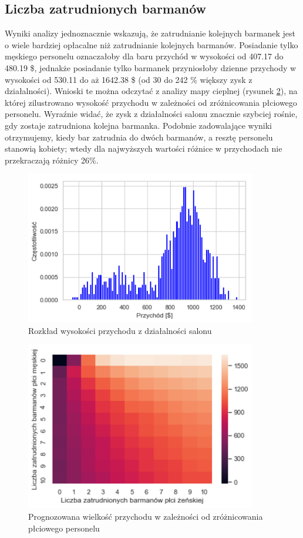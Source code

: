 \documentclass[12pt, a4paper, oneside]{mwart} %
\begin{document}
\subsection{Liczba zatrudnionych barmanów}
Wyniki analizy jednoznacznie wskazują, że zatrudnianie kolejnych barmanek jest o wiele bardziej opłacalne niż zatrudnianie kolejnych barmanów. Posiadanie tylko męskiego personelu oznaczałoby dla baru przychód w wysokości od 407.17 do 480.19 \$, jednakże posiadanie tylko barmanek przyniosłoby dzienne przychody w wysokości od 530.11 do aż 1642.38 \$ (od 30 do 242 \% większy zysk z działalności). Wnioski te można odczytać z analizy mapy cieplnej (rysunek \ref{wyk_barmani}), na której zilustrowano wysokość przychodu w zależności od zróżnicowania płciowego personelu. Wyraźnie widać, że zysk z działalności salonu znacznie szybciej rośnie, gdy zostaje zatrudniona kolejna barmanka. Podobnie zadowalające wyniki otrzymujemy, kiedy bar zatrudnia do dwóch barmanów, a resztę personelu stanowią kobiety; wtedy dla najwyższych wartości różnice w przychodach nie przekraczają różnicy 26\%.
\begin{figure}
\centering
\caption{Rozkład wysokości przychodu z działalności salonu}
\label{wyk_przychod}
\includegraphics[width = 0.9\textwidth]{wykresy/histogram.pdf}
\end{figure}

\begin{figure}
\centering
\caption{Prognozowana wielkość przychodu w zależności od zróżnicowania płciowego personelu}
\label{wyk_barmani}
\includegraphics[width = 0.9\textwidth]{wykresy/barmani.pdf}
\end{figure}
\end{document}
